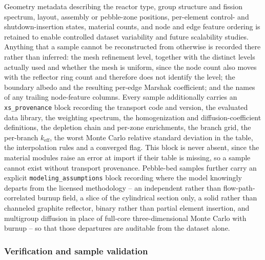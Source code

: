 \documentclass[preprint,12pt]{elsarticle}
\newcommand{\keff}{k_{\mathrm{eff}}}
\begin{document}
Geometry metadata describing the reactor type, group structure and fission
spectrum, layout, assembly or pebble-zone positions, per-element control- and
shutdown-insertion states, material counts, and node and edge feature ordering
is retained to enable controlled dataset variability and future scalability
studies. Anything that a sample cannot be reconstructed from otherwise is
recorded there rather than inferred: the mesh refinement level, together with the
distinct levels actually used and whether the mesh is uniform, since the node
count also moves with the reflector ring count and therefore does not identify
the level; the boundary albedo and the resulting per-edge Marshak coefficient;
and the names of any trailing node-feature columns. Every sample additionally
carries an \texttt{xs\_provenance} block
recording the transport code and version, the evaluated data library, the
weighting spectrum, the homogenization and diffusion-coefficient definitions,
the depletion chain and per-zone enrichments, the branch grid, the per-branch
$\keff$, the worst Monte Carlo relative standard deviation in the table, the
interpolation rules and a converged flag. This block is never absent, since the
material modules raise an error at import if their table is missing, so a
sample cannot exist without transport provenance. Pebble-bed samples further
carry an explicit \texttt{modeling\_assumptions} block recording where the
model knowingly departs from the licensed methodology -- an independent rather
than flow-path-correlated burnup field, a slice of the cylindrical section only,
a solid rather than channeled graphite reflector, binary rather than partial
element insertion, and multigroup diffusion in place of full-core
three-dimensional Monte Carlo with burnup -- so that those departures are
auditable from the dataset alone.

\subsubsection{Verification and sample validation}
\label{sec:verification}
\end{document}
